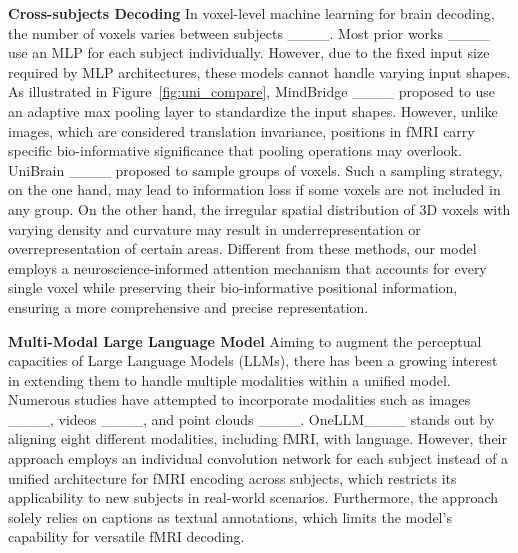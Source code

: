 \noindent\textbf{Cross-subjects Decoding}
In voxel-level machine learning for brain decoding, the number of voxels varies between subjects ____. Most prior works ____ use an MLP for each subject individually. However, due to the fixed input size required by MLP architectures, these models cannot handle varying input shapes. As illustrated in Figure~\ref{fig:uni_compare}, MindBridge ____ proposed to use an adaptive max pooling layer to standardize the input shapes. However, unlike images, which are considered translation invariance, positions in fMRI carry specific bio-informative significance that pooling operations may overlook. UniBrain ____ proposed to sample groups of voxels. Such a sampling strategy, on the one hand, may lead to information loss if some voxels are not included in any group. On the other hand, the irregular spatial distribution of 3D voxels with varying density and curvature may result in underrepresentation or overrepresentation of certain areas. Different from these methods, our model employs a neuroscience-informed attention mechanism that accounts for every single voxel while preserving their bio-informative positional information, ensuring a more comprehensive and precise representation. 


\noindent\textbf{Multi-Modal Large Language Model}
Aiming to augment the perceptual capacities of Large Language Models (LLMs), there has been a growing interest in extending them to handle multiple modalities within a unified model. Numerous studies have attempted to incorporate modalities such as images ____, videos ____, and point clouds ____. %
OneLLM____ stands out by aligning eight different modalities, including fMRI, with language. However, their approach employs an individual convolution network for each subject instead of a unified architecture for fMRI encoding across subjects, which restricts its applicability to new subjects in real-world scenarios. Furthermore, the approach solely relies on captions as textual annotations, which limits the model's capability for versatile fMRI decoding. 

